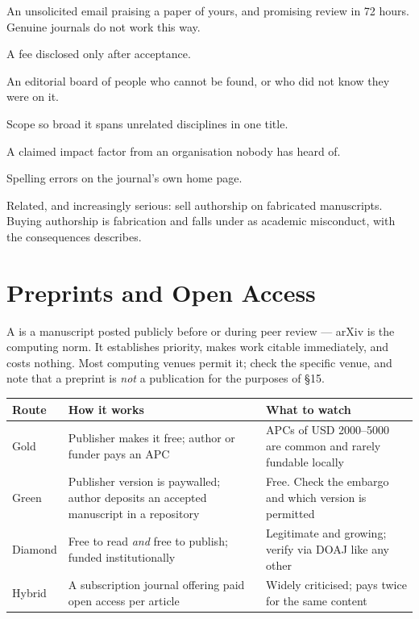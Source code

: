 \begin{pitfall}
\begin{tight}
  \item An unsolicited email praising a paper of yours, and promising review in
    72 hours. Genuine journals do not work this way.
  \item A fee disclosed only after acceptance.
  \item An editorial board of people who cannot be found, or who did not know
    they were on it.
  \item Scope so broad it spans unrelated disciplines in one title.
  \item A claimed impact factor from an organisation nobody has heard of.
  \item Spelling errors on the journal's own home page.
\end{tight}
\medskip
Related, and increasingly serious:  sell authorship on
fabricated manuscripts. Buying authorship is fabrication and falls under
 as academic misconduct, with the consequences
 describes.
\end{pitfall}

\section{Preprints and Open Access}

A  is a manuscript posted publicly before or during peer review
--- arXiv is the computing norm. It establishes priority, makes work citable
immediately, and costs nothing. Most computing venues permit it; check the
specific venue, and note that a preprint is \emph{not} a publication for the
purposes of \S15.

\begin{center}
\small
\begin{tabular}{@{}L{2.3cm}L{5.0cm}L{6.9cm}@{}}
\toprule
\textbf{Route} & \textbf{How it works} & \textbf{What to watch} \\
\midrule
Gold    & Publisher makes it free; author or funder pays an APC
        & APCs of USD 2000--5000 are common and rarely fundable locally \\
Green   & Publisher version is paywalled; author deposits an accepted
          manuscript in a repository
        & Free. Check the embargo and which version is permitted \\
Diamond & Free to read \emph{and} free to publish; funded institutionally
        & Legitimate and growing; verify via DOAJ like any other \\
Hybrid  & A subscription journal offering paid open access per article
        & Widely criticised; pays twice for the same content \\
\bottomrule
\end{tabular}
\end{center}

